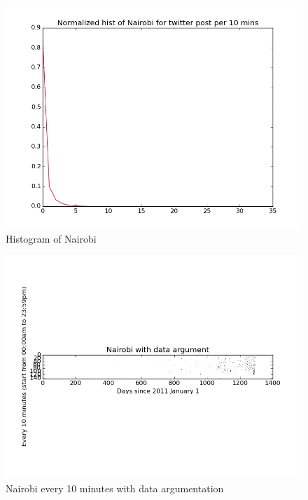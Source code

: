 \documentclass[a4paper,12pt]{article}
\begin{document}
 
  \begin{figure}[H]
  \begin{center}
      \includegraphics[scale=0.8]{1Nairobihisto.png}
\end{center}
\caption{Histogram of Nairobi}
 \label {fig:2}
 \end{figure}
 
 
  \begin{figure}[H]
  \begin{center}
      \includegraphics[scale=0.8]{1Nairobibinary.png}
\end{center}
\caption{Nairobi every 10 minutes with data argumentation}
 \label {fig:2}
 \end{figure}
 
\end{document}
